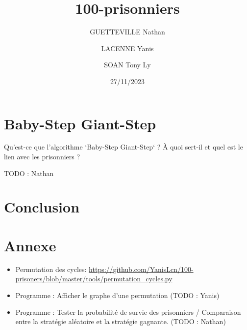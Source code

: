 \documentclass[a4paper]{article}
\title{100-prisonniers}
\date{27/11/2023}
\author{GUETTEVILLE Nathan}
\author{LACENNE Yanis}
\author{SOAN Tony Ly}
\affil{G4S12}
\begin{document}
\maketitle


\tableofcontents

\newpage







\section{Baby-Step Giant-Step}
Qu'est-ce que l'algorithme `Baby-Step Giant-Step` ? À quoi sert-il et quel est le lien avec les prisonniers ?

TODO : Nathan

\section{Conclusion}

\section{Annexe}
\begin{itemize}
	\item Permutation des cycles: \url{https://github.com/YanisLcn/100-prisoners/blob/master/tools/permutation_cycles.py}
	\item Programme : Afficher le graphe d'une permutation
	      (TODO : Yanis)
	\item Programme : Tester la probabilité de survie des prisonniers / Comparaison entre la stratégie aléatoire et la stratégie gagnante.
	      (TODO : Nathan)
\end{itemize}


\end{document}
